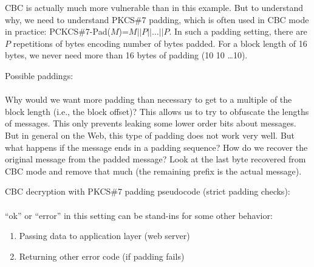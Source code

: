 CBC is actually much more vulnerable than in this example. But to understand why, we need to understand PKCS\#7 padding, which is often used in CBC mode in practice:
PCKCS\#7-Pad($M$)=$M||P||\dots||P$. In such a padding setting, there are $P$ repetitions of bytes encoding number of bytes padded. For a block length of 16 bytes, we never need more than 16 bytes of padding (10 10 \dots 10).

Possible paddings:\\
\vspace{0.2cm}\\

Why would we want more padding than necessary to get to a multiple of the block length (i.e., the block offset)? This allows us to try to obfuscate the lengths of messages. This only prevents leaking some lower order bits about messages. But in general on the Web, this type of padding does not work very well. But what happens if the message ends in a padding sequence? How do we recover the original message from the padded message? Look at the last byte recovered from CBC mode and remove that much (the remaining prefix is the actual message).

CBC decryption with PKCS\#7 padding pseudocode (strict padding checks):\\
\vspace{0.2cm}\\
``ok'' or ``error'' in this setting can be stand-ins for some other behavior:
\begin{enumerate}
    \item Passing data to application layer (web server)
    \item Returning other error code (if padding fails)
\end{enumerate}

